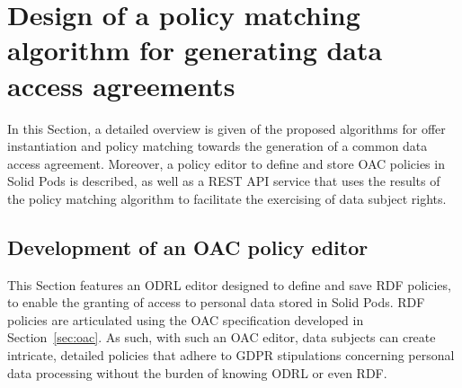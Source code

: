 \section{Design of a policy matching algorithm for generating data access agreements}
\label{sec:algorithm}

In this Section, a detailed overview is given of the proposed algorithms for offer instantiation and policy matching towards the generation of a common data access agreement.
Moreover, a policy editor to define and store OAC policies in Solid Pods is described, as well as a REST API service that uses the results of the policy matching algorithm to facilitate the exercising of data subject rights.

\subsection{Development of an OAC policy editor}
\label{sec:sope}

This Section features an ODRL editor designed to define and save RDF policies, to enable the granting of access to personal data stored in Solid Pods.
RDF policies are articulated using the OAC specification developed in Section~\ref{sec:oac}.
As such, with such an OAC editor, data subjects can create intricate, detailed policies that adhere to GDPR stipulations concerning personal data processing without the burden of knowing ODRL or even RDF.

